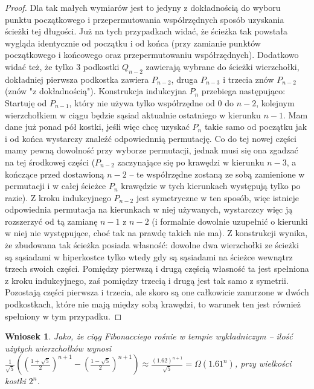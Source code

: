 \documentclass{pracamgr}
\newtheorem{corollary}[theorem]{Wniosek}
\begin{document}
\begin{proof}
     Dla tak małych wymiarów jest to jedyny z dokładnością do wyboru punktu początkowego i przepermutowania współrzędnych sposób uzyskania ścieżki tej długości.
     Już na tych przypadkach widać, że ścieżka tak powstała wygląda identycznie od początku i od końca
     (przy zamianie punktów początkowego i końcowego oraz przepermutowaniu współrzędnych). Dodatkowo widać też,
     że tylko 3 podkostki $Q_{n-2}$ zawierają wybrane do ścieżki wierzchołki, dokładniej pierwsza podkostka zawiera $P_{n-2}$, druga $P_{n-3}$
     i trzecia znów $P_{n-2}$ (znów "z dokładnością").\newline
     Konstrukcja indukcyjna $P_n$ przebiega następująco:\newline
     Startuję od $P_{n-1}$, który nie używa tylko współrzędne od $0$ do $n-2$, kolejnym wierzchołkiem w ciągu będzie sąsiad aktualnie ostatniego w kierunku
     $n-1$. Mam dane już ponad pół kostki, jeśli więc chcę uzyskać $P_n$ takie samo od początku jak i od końca wystarczy znaleźć odpowiednnią permutację.
     Co do tej nowej części mamy pewną dowolność przy wyborze permutacji, jednak musi się ona zgadzać na tej środkowej części
     ($P_{n-2}$ zaczynające się po krawędzi w kierunku $n-3$, a kończące przed dostawioną $n-2$ -- te współrzędne zostaną ze sobą zamienione w permutacji
     i w całej ścieżce $P_n$ krawędzie w tych kierunkach występują tylko po razie). Z kroku indukcyjnego $P_{n-2}$ jest symetryczne w ten sposób,
     więc istnieje odpowiednia permutacja na kierunkach w niej używanych, wystarczcy więc ją rozszerzyć od tą zamianę $n-1$ z $n-2$
     (i formalnie dowolnie uzupełnić o kierunki w niej nie występujące, choć tak na prawdę takich nie ma).
     Z konstrukcji wynika, że zbudowana tak ścieżka posiada własność: dowolne dwa wierzchołki ze ścieżki są sąsiadami w hiperkostce
     tylko wtedy gdy są sąsiadami na ścieżce wewnątrz trzech swoich części. Pomiędzy pierwszą i drugą częścią własność ta jest spełniona z kroku indukcyjnego,
     zaś pomiędzy trzecią i drugą jest tak samo z symetrii. Pozostają części pierwsza i trzecia, ale skoro są one całkowicie zanurzone w dwóch podkostkach,
     które nie mają między sobą krawędzi, to warunek ten jest również spełniony w tym przypadku.
    \end{proof}
    \begin{corollary}\label{fibo -> wykladniczy}
     Jako, że ciąg Fibonacciego rośnie w tempie wykładniczym -- ilość użytych wierzchołków wynosi
     $\frac{1}{\sqrt{5}}((\frac{1+\sqrt{5}}{2})^{n+1}-(\frac{1-\sqrt{5}}{2})^{n+1})\approx \frac{(1.62)^{n+1}}{\sqrt{5}}=\Omega(1.61^n)$, przy wielkości kostki $2^n$.
    \end{corollary}
\end{document}

